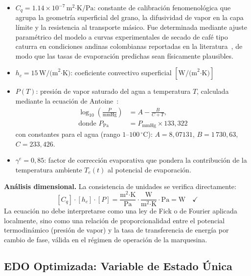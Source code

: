\documentclass[conference]{IEEEtran}
\begin{document}
\begin{itemize}

\item $C_q = 1.14\times10^{-7}\,\text{m}^2\text{·K/Pa}$: constante de calibración fenomenológica que agrupa la geometría superficial del grano, la difusividad de vapor en la capa límite y la resistencia al transporte másico. Fue determinada mediante ajuste paramétrico del modelo a curvas experimentales de secado de café tipo caturra en condiciones andinas colombianas reportadas en la literatura~\cite{parra08,ciro10}, de modo que las tasas de evaporación predichas sean físicamente plausibles.

\item $h_c = 15\,\text{W/(m}^2\text{·K)}$: coeficiente convectivo superficial $[\text{W/(m}^2\text{·K)}]$

\item $P(T)$: presión de vapor saturado del agua a temperatura $T$, calculada mediante la ecuación de Antoine~\cite{cerci19}:
\begin{align}
\log_{10}\left(\frac{P}{\text{mmHg}}\right) &= A - \frac{B}{C + T}, \label{eq:antoine} \\[1ex]
\text{donde } P_{\text{Pa}} &= P_{\text{mmHg}} \times 133{,}322 \nonumber
\end{align}
con constantes para el agua (rango $1\text{–}100\,^{\circ}$C): $A = 8{,}07131$, $B = 1\,730{,}63$, $C = 233{,}426$.

\item $\gamma^e = 0{,}85$: factor de corrección evaporativa que pondera la contribución de la temperatura ambiente $T_e(t)$ al potencial de evaporación.

\end{itemize}

\textbf{Análisis dimensional.} La consistencia de unidades se verifica directamente:
\[
[C_q]\cdot[h_c]\cdot[P]
= \frac{\text{m}^2\text{·K}}{\text{Pa}}
\cdot \frac{\text{W}}{\text{m}^2\text{·K}}
\cdot \text{Pa}
= \text{W}\quad\checkmark
\]
La ecuación no debe interpretarse como una ley de Fick o de Fourier aplicada localmente, sino como una relación de proporcionalidad entre el potencial termodinámico (presión de vapor) y la tasa de transferencia de energía por cambio de fase, válida en el régimen de operación de la marquesina.

\subsection{EDO Optimizada: Variable de Estado Única}
\end{document}
